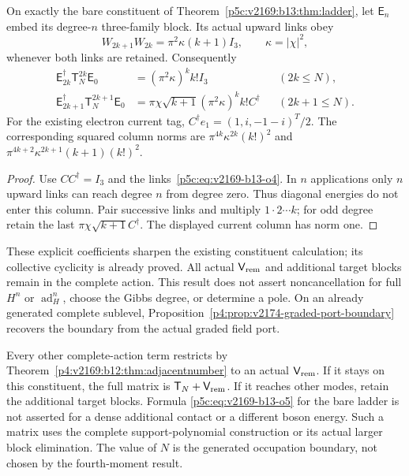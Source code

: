 \documentclass[12pt,a4paper]{article}
\begin{document}
\begin{corollary}
\label{p5c:cor:v2174-highest-degree-weak-word}
On exactly the bare constituent of
Theorem~\ref{p5c:v2169:b13:thm:ladder}, let $\mathsf E_n$ embed its
degree-$n$ three-family block. Its actual upward links obey
\[
 W_{2k+1}W_{2k}=\pi^2\kappa(k+1)I_3,
 \qquad \kappa=|\chi|^2,
\]
whenever both links are retained. Consequently
\begin{align}
 \mathsf E_{2k}^\dagger\mathsf T_N^{2k}\mathsf E_0
     &=(\pi^2\kappa)^k k!I_3 &&(2k\le N),\nonumber\\
 \mathsf E_{2k+1}^\dagger\mathsf T_N^{2k+1}\mathsf E_0
     &=\pi\chi\sqrt{k+1}(\pi^2\kappa)^k k!C^\dagger
       &&(2k+1\le N).
 \label{p5c:eq:v2174-highest-degree-weak-word}
\end{align}
For the existing electron current tag,
$C^\dagger e_1=(1,i,-1-i)^T/2$. The corresponding squared column norms
are $\pi^{4k}\kappa^{2k}(k!)^2$ and
$\pi^{4k+2}\kappa^{2k+1}(k+1)(k!)^2$.
\end{corollary}
\begin{proof}
Use $CC^\dagger=I_3$ and the links~\eqref{p5c:eq:v2169-b13-o4}.
In $n$ applications only $n$ upward links can reach degree $n$ from degree
zero. Thus diagonal energies do not enter this column. Pair successive links
and multiply $1\cdot2\cdots k$; for odd degree retain the last
$\pi\chi\sqrt{k+1}C^\dagger$. The displayed current column has norm one.
\end{proof}
These explicit coefficients sharpen the existing constituent calculation;
its collective cyclicity is already proved. All actual $\mathsf V_{\rm rem}$
and additional target blocks remain in the complete action. This result
does not assert noncancellation for full $H^n$ or $\operatorname{ad}_H^n$,
choose the Gibbs degree, or determine a pole. On an already generated complete
sublevel, Proposition~\ref{p4:prop:v2174-graded-port-boundary} recovers the
boundary from the actual graded field port.




Every other complete-action term restricts by Theorem~\ref{p4:v2169:b12:thm:adjacentnumber} to an actual
$\mathsf V_{\rm rem}$. If it stays on this constituent, the full matrix is
$\mathsf T_N+\mathsf V_{\rm rem}$. If it reaches other modes, retain the
additional target blocks. Formula \eqref{p5c:eq:v2169-b13-o5} for the bare ladder is not asserted
for a dense additional contact or a different boson energy. Such a matrix
uses the complete support-polynomial construction or its actual larger
block elimination. The value of $N$ is the generated occupation boundary,
not chosen by the fourth-moment result.
\end{document}

